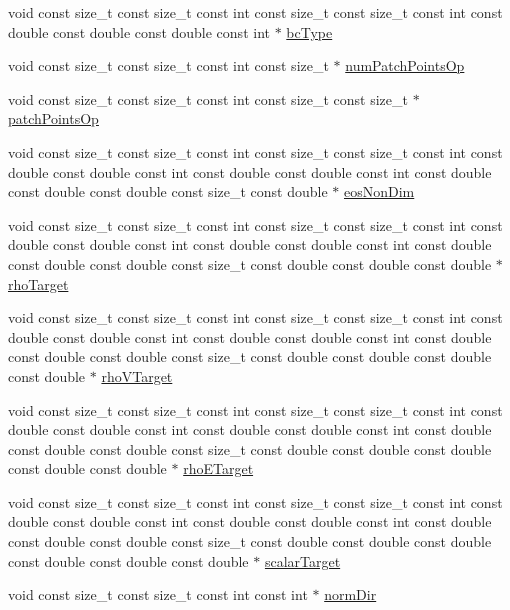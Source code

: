 \begin{DoxyCompactItemize}
\item 
void const size\+\_\+t const size\+\_\+t const int const size\+\_\+t const size\+\_\+t const int const double const double const double const int $\ast$ \hyperlink{WENOKernels_8H_a487076dc9e8353b4914f8aba0e71ad93}{bc\+Type}
\item 
void const size\+\_\+t const size\+\_\+t const int const size\+\_\+t $\ast$ \hyperlink{WENOKernels_8H_aad16c16fe24d418263e6217978cf2070}{num\+Patch\+Points\+Op}
\item 
void const size\+\_\+t const size\+\_\+t const int const size\+\_\+t const size\+\_\+t $\ast$ \hyperlink{WENOKernels_8H_a437371152e737bf608b166f946c3bcf4}{patch\+Points\+Op}
\item 
void const size\+\_\+t const size\+\_\+t const int const size\+\_\+t const size\+\_\+t const int const double const double const int const double const double const int const double const double const double const size\+\_\+t const double $\ast$ \hyperlink{WENOKernels_8H_ae84c458d3f8dce53d214eabcdc84b623}{eos\+Non\+Dim}
\item 
void const size\+\_\+t const size\+\_\+t const int const size\+\_\+t const size\+\_\+t const int const double const double const int const double const double const int const double const double const double const size\+\_\+t const double const double const double $\ast$ \hyperlink{WENOKernels_8H_a65e35e96da987b91dd8e3df4434b6308}{rho\+Target}
\item 
void const size\+\_\+t const size\+\_\+t const int const size\+\_\+t const size\+\_\+t const int const double const double const int const double const double const int const double const double const double const size\+\_\+t const double const double const double const double $\ast$ \hyperlink{WENOKernels_8H_a69efdc45672ceb8fb33b5e7d1971a4d4}{rho\+V\+Target}
\item 
void const size\+\_\+t const size\+\_\+t const int const size\+\_\+t const size\+\_\+t const int const double const double const int const double const double const int const double const double const double const size\+\_\+t const double const double const double const double const double $\ast$ \hyperlink{WENOKernels_8H_ac62021f907a130aa7534b0cb7eb3d0b0}{rho\+E\+Target}
\item 
void const size\+\_\+t const size\+\_\+t const int const size\+\_\+t const size\+\_\+t const int const double const double const int const double const double const int const double const double const double const size\+\_\+t const double const double const double const double const double const double $\ast$ \hyperlink{WENOKernels_8H_a3680941feb6c14eadd3e8c5eb4c9eee5}{scalar\+Target}
\item 
void const size\+\_\+t const size\+\_\+t const int const int $\ast$ \hyperlink{WENOKernels_8H_ab858ec0dee6bbc6698b28fe84576d1d1}{norm\+Dir}
\end{DoxyCompactItemize}


